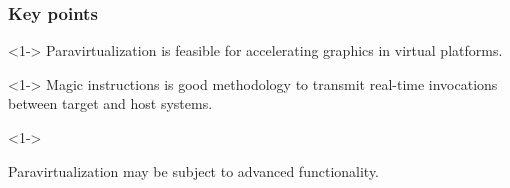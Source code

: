 
\begin{frame}
\frametitle{Key points}

\begin{thm}<1->
Paravirtualization is feasible for accelerating graphics in virtual platforms.
\end{thm}

\begin{thm}<1->
Magic instructions is good methodology to transmit real-time invocations between target and host systems.
\end{thm}

\begin{thm}<1->
\begin{graytext}
Paravirtualization may be subject to advanced functionality.
\end{graytext}
\end{thm}

\end{frame}